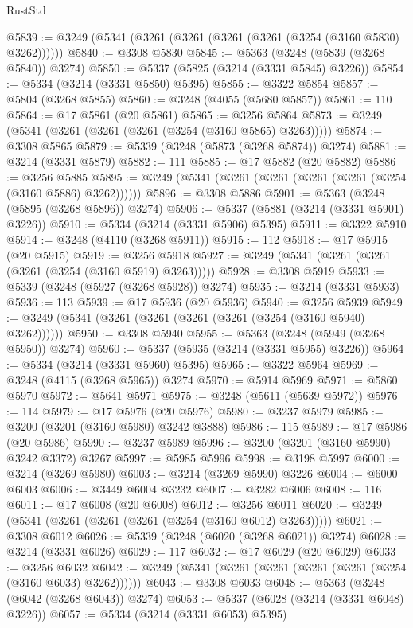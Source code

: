 \begin{lexlean}{RustStd}
\begin{coremodule}
{\begin{coremodule}
{{{{{{{{{{{{{{{{{{{{{{{{{@5839 := @3249 (@5341 (@3261 (@3261 (@3261 (@3261 (@3254 (@3160 @5830) @3262))))))
@5840 := @3308 @5830
@5845 := @5363 (@3248 (@5839 (@3268 @5840)) @3274)
@5850 := @5337 (@5825 (@3214 (@3331 @5845) @3226))
@5854 := @5334 (@3214 (@3331 @5850) @5395)
@5855 := @3322 @5854
@5857 := @5804 (@3268 @5855)
@5860 := @3248 (@4055 (@5680 @5857))
@5861 := 110
@5864 := @17 @5861 (@20 @5861)
@5865 := @3256 @5864
@5873 := @3249 (@5341 (@3261 (@3261 (@3261 (@3254 (@3160 @5865) @3263)))))
@5874 := @3308 @5865
@5879 := @5339 (@3248 (@5873 (@3268 @5874)) @3274)
@5881 := @3214 (@3331 @5879)
@5882 := 111
@5885 := @17 @5882 (@20 @5882)
@5886 := @3256 @5885
@5895 := @3249 (@5341 (@3261 (@3261 (@3261 (@3261 (@3254 (@3160 @5886) @3262))))))
@5896 := @3308 @5886
@5901 := @5363 (@3248 (@5895 (@3268 @5896)) @3274)
@5906 := @5337 (@5881 (@3214 (@3331 @5901) @3226))
@5910 := @5334 (@3214 (@3331 @5906) @5395)
@5911 := @3322 @5910
@5914 := @3248 (@4110 (@3268 @5911))
@5915 := 112
@5918 := @17 @5915 (@20 @5915)
@5919 := @3256 @5918
@5927 := @3249 (@5341 (@3261 (@3261 (@3261 (@3254 (@3160 @5919) @3263)))))
@5928 := @3308 @5919
@5933 := @5339 (@3248 (@5927 (@3268 @5928)) @3274)
@5935 := @3214 (@3331 @5933)
@5936 := 113
@5939 := @17 @5936 (@20 @5936)
@5940 := @3256 @5939
@5949 := @3249 (@5341 (@3261 (@3261 (@3261 (@3261 (@3254 (@3160 @5940) @3262))))))
@5950 := @3308 @5940
@5955 := @5363 (@3248 (@5949 (@3268 @5950)) @3274)
@5960 := @5337 (@5935 (@3214 (@3331 @5955) @3226))
@5964 := @5334 (@3214 (@3331 @5960) @5395)
@5965 := @3322 @5964
@5969 := @3248 (@4115 (@3268 @5965)) @3274
@5970 := @5914 @5969
@5971 := @5860 @5970
@5972 := @5641 @5971
@5975 := @3248 (@5611 (@5639 @5972))
@5976 := 114
@5979 := @17 @5976 (@20 @5976)
@5980 := @3237 @5979
@5985 := @3200 (@3201 (@3160 @5980) @3242 @3888)
@5986 := 115
@5989 := @17 @5986 (@20 @5986)
@5990 := @3237 @5989
@5996 := @3200 (@3201 (@3160 @5990) @3242 @3372) @3267
@5997 := @5985 @5996
@5998 := @3198 @5997
@6000 := @3214 (@3269 @5980)
@6003 := @3214 (@3269 @5990) @3226
@6004 := @6000 @6003
@6006 := @3449 @6004 @3232
@6007 := @3282 @6006
@6008 := 116
@6011 := @17 @6008 (@20 @6008)
@6012 := @3256 @6011
@6020 := @3249 (@5341 (@3261 (@3261 (@3261 (@3254 (@3160 @6012) @3263)))))
@6021 := @3308 @6012
@6026 := @5339 (@3248 (@6020 (@3268 @6021)) @3274)
@6028 := @3214 (@3331 @6026)
@6029 := 117
@6032 := @17 @6029 (@20 @6029)
@6033 := @3256 @6032
@6042 := @3249 (@5341 (@3261 (@3261 (@3261 (@3261 (@3254 (@3160 @6033) @3262))))))
@6043 := @3308 @6033
@6048 := @5363 (@3248 (@6042 (@3268 @6043)) @3274)
@6053 := @5337 (@6028 (@3214 (@3331 @6048) @3226))
@6057 := @5334 (@3214 (@3331 @6053) @5395)
}}}}}}}}}}}}}}}}}}}}}}}}}
\end{coremodule}}
\end{coremodule}
\end{lexlean}
